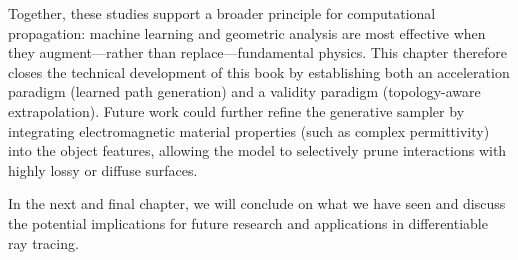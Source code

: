 Together, these studies support a broader principle for computational propagation: machine learning and geometric analysis are most effective when they augment---rather than replace---fundamental physics. This chapter therefore closes the technical development of this book by establishing both an acceleration paradigm (learned path generation) and a validity paradigm (topology-aware extrapolation). Future work could further refine the generative sampler by integrating electromagnetic material properties (such as complex permittivity) into the object features, allowing the model to selectively prune interactions with highly lossy or diffuse surfaces.

In the next and final chapter, we will conclude on what we have seen and discuss the potential implications for future research and applications in differentiable ray tracing.
